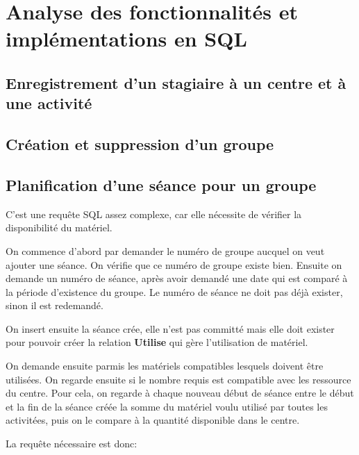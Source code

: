 \documentclass[10pt]{article}
\begin{document}
\section{Analyse des fonctionnalités et implémentations en SQL}

\subsection{Enregistrement d'un stagiaire à un centre et à une activité}

\subsection{Création et suppression d'un groupe}

\subsection{Planification d'une séance pour un groupe}


C'est une requête SQL assez complexe, car elle nécessite de vérifier la disponibilité du matériel.

On commence d'abord par demander le numéro de groupe aucquel on veut ajouter une séance. On vérifie que ce numéro
de groupe existe bien. Ensuite on demande un numéro de séance, après avoir demandé une date qui est comparé à la
période d'existence du groupe. Le numéro de séance ne doit pas déjà exister, sinon il est redemandé.

On insert ensuite la séance crée, elle n'est pas committé mais elle doit exister pour pouvoir créer la relation
\textbf{Utilise} qui gère l'utilisation de matériel. 

On demande ensuite parmis les matériels compatibles lesquels doivent être utilisées. On regarde ensuite si le nombre requis est
compatible avec les ressource du centre. Pour cela, on regarde à chaque nouveau début de séance entre le début et la fin de la séance
créée la somme du matériel voulu utilisé par toutes les activitées, puis on le compare à la quantité disponible dans le centre.

La requête nécessaire est donc:
\end{document}
